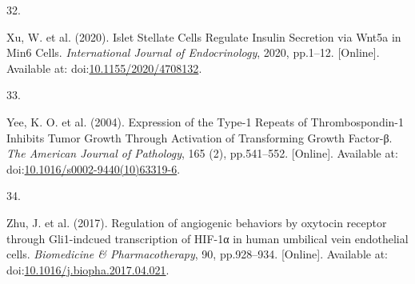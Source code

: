 \documentclass[
  11pt,
]{article}
\newlength{\cslhangindent}
\newlength{\csllabelwidth}
\newlength{\cslentryspacingunit} %
\newenvironment{CSLReferences}[2] %
 {%
  \setlength{\parindent}{0pt}
  \ifodd #1
  \let\oldpar\par
  \def\par{\hangindent=\cslhangindent\oldpar}
  \fi
  \setlength{\parskip}{#2\cslentryspacingunit}
 }%
 {}
\newcommand{\CSLLeftMargin}[1]{\parbox[t]{\csllabelwidth}{#1}}
\newcommand{\CSLRightInline}[1]{\parbox[t]{\linewidth - \csllabelwidth}{#1}\break}
\begin{document}
\begin{CSLReferences}{0}{0}
\leavevmode{}%
\CSLLeftMargin{32. }
\CSLRightInline{Xu, W. {et al.} (2020). {Islet Stellate Cells Regulate Insulin Secretion via Wnt5a in Min6 Cells}. \emph{International Journal of Endocrinology}, 2020, pp.1--12. {[}Online{]}. Available at: doi:\href{https://doi.org/10.1155/2020/4708132}{10.1155/2020/4708132}.}

\leavevmode{}%
\CSLLeftMargin{33. }
\CSLRightInline{Yee, K. O. {et al.} (2004). {Expression of the Type-1 Repeats of Thrombospondin-1 Inhibits Tumor Growth Through Activation of Transforming Growth Factor-β}. \emph{The American Journal of Pathology}, 165 (2), pp.541--552. {[}Online{]}. Available at: doi:\href{https://doi.org/10.1016/s0002-9440(10)63319-6}{10.1016/s0002-9440(10)63319-6}.}

\leavevmode{}%
\CSLLeftMargin{34. }
\CSLRightInline{Zhu, J. {et al.} (2017). {Regulation of angiogenic behaviors by oxytocin receptor through Gli1-indcued transcription of HIF-1α in human umbilical vein endothelial cells}. \emph{Biomedicine \& Pharmacotherapy}, 90, pp.928--934. {[}Online{]}. Available at: doi:\href{https://doi.org/10.1016/j.biopha.2017.04.021}{10.1016/j.biopha.2017.04.021}.}

\end{CSLReferences}
\end{document}
